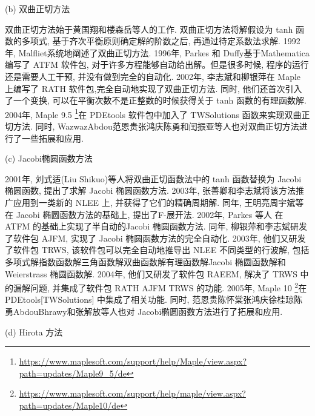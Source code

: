 (b) 双曲正切方法 

双曲正切方法始于黄国翔和楼森岳等人\cite{huang1989exact}的工作. 双曲正切方法将解假设为 tanh 函数的多项式, 基于齐次平衡原则确定解的阶数之后, 再通过待定系数法求解. 1992年, Malfliet\cite{malfliet1992solitary}系统地阐述了双曲正切方法. 1996年, Parkes 和 Duffy\cite{parkes1996automated}基于Mathematica 编写了 ATFM 软件包, 对于许多方程能够自动给出解。但是很多时候, 程序的运行还是需要人工干预, 并没有做到完全的自动化. 2002年, 李志斌和柳银萍\cite{liu2001master,li2002rath}在 Maple 上编写了 RATH 软件包,完全自动地实现了双曲正切方法. 同时, 他们还首次引入了一个变换, 可以在平衡次数不是正整数的时候获得关于 tanh 函数的有理函数解. 2004年, Maple 9.5 \footnote{\url{https://www.maplesoft.com/support/help/Maple/view.aspx?path=updates/Maple9_5/de}}在 PDEtools 软件包中加入了 TWSolutions 函数来实现双曲正切方法. 同时, Wazwaz\cite{wazwaz2004tanh}\D Abdou\cite{abdou2007extended}\D 范恩贵\cite{fan2000extended}\D 张鸿庆\cite{lu2003further}\D 陈勇\cite{zheng2003generalized}和闰振亚\cite{yan2001new}等人也对双曲正切方法进行了一些拓展和应用. 

(c) Jacobi椭圆函数方法

2001年, 刘式适(Liu Shikuo)等人\cite{liu2001jacobi}将双曲正切函数法中的 tanh 函数替换为 Jacobi 椭圆函数, 提出了求解 Jacobi 椭圆函数方法. 2003年, 张善卿和李志斌\cite{zhang2003jacobi}将该方法推广应用到一类新的 NLEE 上, 并获得了它们的精确周期解. 同年, 王明亮\D 周宇斌等\cite{zhou2003periodic}在 Jacobi 椭圆函数方法的基础上, 提出了F-展开法. 2002年, Parkes 等人\cite{parkes2002jacobi} 在 ATFM 的基础上实现了半自动的Jacobi 椭圆函数方法. 同年, 柳银萍和李志斌\cite{yin2002automated}研发了软件包 AJFM, 实现了 Jacobi 椭圆函数方法的完全自动化. 2003年, 他们\cite{yin2003automated}又研发了软件包 TRWS, 该软件包可以完全自动地推导出 NLEE 不同类型的行波解, 包括多项式解\D 指数函数解\D 三角函数解\D 双曲函数解\D 有理函数解\D Jacobi 椭圆函数解和 Weierstrass 椭圆函数解. 2004年, 他们\cite{li2004raeem}又研发了软件包 RAEEM, 解决了 TRWS 中的漏解问题, 并集成了软件包 RATH \D AJFM \D TRWS 的功能. 2005年, Maple 10 \footnote{\url{https://www.maplesoft.com/support/help/maple/view.aspx?path=updates/Maple10/de}}在 PDEtools[TWSolutions] 中集成了相关功能. 同时, 范恩贵\cite{fan2002applications}\D 陈怀棠\cite{chen2003improved}\D 张鸿庆\cite{wang2005new,yu2005extended}\D 徐桂琼\cite{gui2005applications}\D 陈勇\cite{chen2005extended}\D Abdou\cite{abdou2007construction}\D Bhrawy\cite{bhrawy2013cnoidal}和张解放\cite{jia2004general,chao2005symbolic}等人也对 Jacobi椭圆函数方法进行了拓展和应用. 

(d) Hirota 方法

